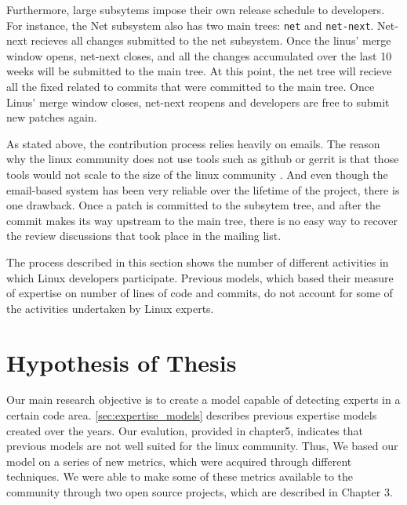 Furthermore, large subsytems impose their own release schedule to developers. For instance, the Net subsystem also has two main trees: \texttt{net} and \texttt{net-next}. Net-next recieves all changes submitted to the net subsystem. Once the linus' merge window opens, net-next closes, and all the changes accumulated over the last 10 weeks will be submitted to the main tree. At this point, the net tree will recieve all the fixed related to commits that were committed to the main tree. Once Linus' merge window closes, net-next reopens and developers are free to submit new patches again. 

As stated above, the contribution process relies heavily on emails. The reason why the linux community does not use tools such as github or gerrit is that those tools would not scale to the size of the linux community \citep{armstrong}. And even though the email-based system has been very reliable over the lifetime of the project, there is one drawback. Once a patch is committed to the subsytem tree, and after the commit makes its way upstream to the main tree, there is no easy way to recover the review discussions that took place in the mailing list. 

The process described in this section shows the number of different activities in which Linux developers participate. Previous models, which based their measure of expertise on number of lines of code and commits, do not account for some of the activities undertaken by Linux experts. 




\section{Hypothesis of Thesis}

Our main research objective is to create a model capable of detecting experts in a certain code area. \autoref{sec:expertise_models} describes previous expertise models created over the years. Our evalution, provided in chapter5, indicates that previous models are not well suited for the linux community. Thus, We based our model on a series of new metrics, which were acquired through different techniques. We were able to make some of these metrics available to the community through two open source projects, which are described in Chapter 3.



